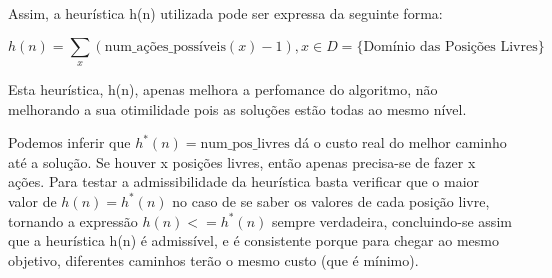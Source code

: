 \documentclass[12pt,a4paper]{article}
\begin{document}
  Assim, a heurística h(n) utilizada pode ser expressa da seguinte forma:
  
  $$
  h(n) = \sum_x {(\text{num\_ações\_possíveis}(x) -1)} , x \in D = \{\text{Domínio das Posições Livres}\}
  $$

  
  Esta heurística, h(n), apenas melhora a perfomance do algoritmo, não melhorando a sua otimilidade pois as soluções estão todas ao mesmo nível.

  Podemos inferir que $h^*(n) = \text{num\_pos\_livres}$ dá o custo real do melhor caminho até a solução. Se houver x posições livres, então apenas precisa-se de fazer x ações.
  Para testar a admissibilidade da heurística basta verificar que o maior valor de $h(n) = h^*(n)$ no caso de se saber os valores de cada posição livre, tornando a expressão $h(n) <= h^*(n)$ sempre verdadeira,
  concluindo-se assim que a heurística h(n) é admissível, e é consistente porque para chegar ao mesmo objetivo, diferentes caminhos terão o mesmo custo (que é mínimo).
\end{document}
